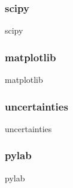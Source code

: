    \subsubsection{scipy}
      \begin{frame}{scipy}
      \end{frame}
    
    \subsubsection{matplotlib}
      \begin{frame}{matplotlib}
      \end{frame}
    
    \subsubsection{uncertainties}
      \begin{frame}{uncertainties}
      \end{frame}
    
    \subsubsection{pylab}
      \begin{frame}{pylab}
      \end{frame}
